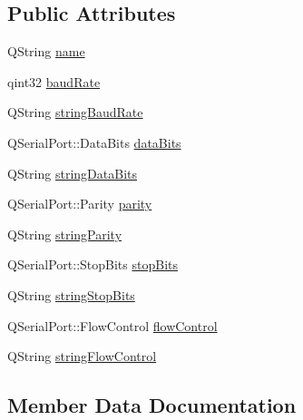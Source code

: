 \subsection*{Public Attributes}
\begin{DoxyCompactItemize}
\item 
Q\+String \mbox{\hyperlink{struct_settings_dialog_1_1_settings_a973c8cfb942a512f34fc4227c0caa6dd}{name}}
\item 
qint32 \mbox{\hyperlink{struct_settings_dialog_1_1_settings_ac19cc9431552857a75c657a464ba0700}{baud\+Rate}}
\item 
Q\+String \mbox{\hyperlink{struct_settings_dialog_1_1_settings_a54e9d461f783386f314bc24b96665e53}{string\+Baud\+Rate}}
\item 
Q\+Serial\+Port\+::\+Data\+Bits \mbox{\hyperlink{struct_settings_dialog_1_1_settings_a7dcd85d028a09508cb4567cf631b40e9}{data\+Bits}}
\item 
Q\+String \mbox{\hyperlink{struct_settings_dialog_1_1_settings_ab589b733b78af17744ab75067bfce051}{string\+Data\+Bits}}
\item 
Q\+Serial\+Port\+::\+Parity \mbox{\hyperlink{struct_settings_dialog_1_1_settings_ae08a00aa2e45218dade9046e3624cce7}{parity}}
\item 
Q\+String \mbox{\hyperlink{struct_settings_dialog_1_1_settings_aa2c662b2fb315f038e827d63d83b059b}{string\+Parity}}
\item 
Q\+Serial\+Port\+::\+Stop\+Bits \mbox{\hyperlink{struct_settings_dialog_1_1_settings_ab88ff384f7c1127bcbe2dd97b49696a4}{stop\+Bits}}
\item 
Q\+String \mbox{\hyperlink{struct_settings_dialog_1_1_settings_abde3c8410f779688ce6c2fcbbbb84f10}{string\+Stop\+Bits}}
\item 
Q\+Serial\+Port\+::\+Flow\+Control \mbox{\hyperlink{struct_settings_dialog_1_1_settings_aa962a6e7dbb8338af154305e4ff46cfc}{flow\+Control}}
\item 
Q\+String \mbox{\hyperlink{struct_settings_dialog_1_1_settings_a1b0a388ec5059bd2628acf9b7728f2f3}{string\+Flow\+Control}}
\end{DoxyCompactItemize}


\subsection{Member Data Documentation}
\mbox{\label{struct_settings_dialog_1_1_settings_ac19cc9431552857a75c657a464ba0700}} 
